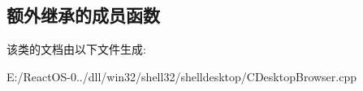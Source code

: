 \subsection*{额外继承的成员函数}


该类的文档由以下文件生成\+:\begin{DoxyCompactItemize}
\item 
E\+:/\+React\+O\+S-\/0../dll/win32/shell32/shelldesktop/C\+Desktop\+Browser.\+cpp\end{DoxyCompactItemize}
